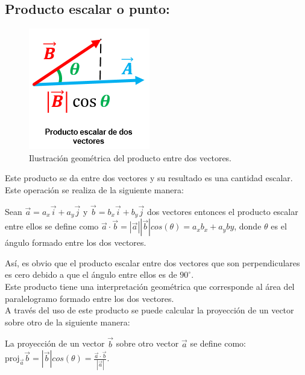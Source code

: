 \subsection{Producto escalar o punto:}

\begin{figure}[H]
 \centering
 \includegraphics[scale=0.7]{images/productoescalar.png}
 \caption{Ilustración geométrica del producto entre dos vectores.}
 \label{fig:escalar}
\end{figure}

Este producto se da entre dos vectores y su resultado es una cantidad escalar. Este operación se realiza de la 
siguiente manera:

\begin{tcolorbox}
Sean $\vec{a} =a_x\vec{i}+a_y\vec{j}$ y $\vec{b}=b_x\vec{i}+b_y\vec{j}$ dos vectores entonces el producto escalar 
entre ellos se define como $\vec{a}\cdot\vec{b}=|\vec{a}||\vec{b}|cos(\theta)= a_xb_x+a_yby$, donde $\theta$ es el 
ángulo formado entre los dos vectores.
\end{tcolorbox}

Así, es obvio que el producto escalar entre dos vectores que son perpendiculares es cero debido a que el ángulo entre 
ellos es de $90^\circ$.\\

Este producto tiene una interpretación geométrica que corresponde al área del paralelogramo formado entre los dos vectores.\\

A través del uso de este producto se puede calcular la proyección de un vector sobre otro de la siguiente manera:

\begin{tcolorbox}
La proyección de un vector $\vec{b}$ sobre otro vector $\vec{a}$ se define como: $\text{proj}_{\vec{a}}\vec{b} 
=|\vec{b}|cos(\theta)= \frac{\vec{a}\cdot\vec{b}}{|\vec{a}|}$.
\end{tcolorbox}

